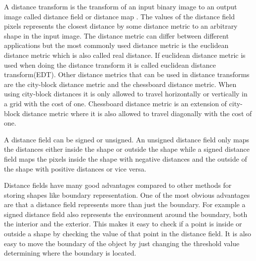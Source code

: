 A distance transform is the transform of an input binary image to an output image called distance field or distance map \citep{rosenfeld1966}. The values of the distance field pixels represents the closest distance by some distance metric to an arbitrary shape in the input image. The distance metric can differ between different applications but the most commonly used distance metric is the euclidean distance metric which is also called real distance. If euclidean distance metric is used when doing the distance transform it is called euclidean distance transform(EDT). Other distance metrics that can be used in distance transforms are the city-block distance metric and the chessboard distance metric. When using city-block distances it is only allowed to travel horizontally or vertically in a grid with the cost of one. Chessboard distance metric is an extension of city-block distance metric where it is also allowed to travel diagonally with the cost of one. 

A distance field can be signed or unsigned. An unsigned distance field only maps the distances either inside the shape or outside the shape while a signed distance field maps the pixels inside the shape with negative distances and the outside of the shape with positive distances or vice versa.

Distance fields have many good advantages compared to other methods for storing shapes like boundary representation. One of the most obvious advantages are that a distance field represents more than just the boundary. For example a signed distance field also represents the environment around the boundary, both the interior and the exterior. This makes it easy to check if a point is inside or outside a shape by checking the value of that point in the distance field. It is also easy to move the boundary of the object by just changing the threshold value determining where the boundary is located. \citep{Jones2006}

